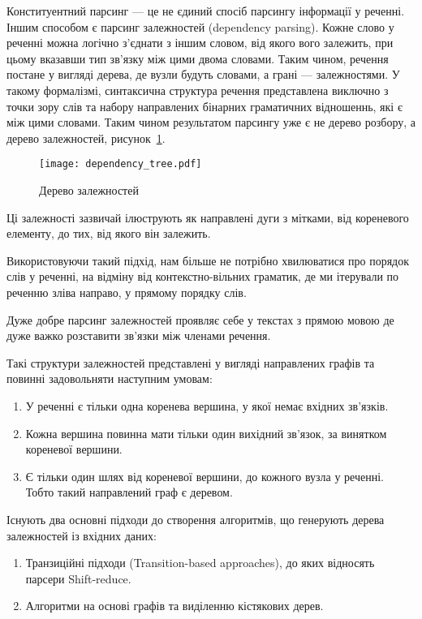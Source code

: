 Конституентний парсинг --- це не єдиний спосіб парсингу інформації у реченні.
Іншим способом є парсинг залежностей (dependency parsing). Кожне слово у
реченні можна логічно з'єднати з іншим словом, від якого вого залежить,
при цьому вказавши тип зв'язку між цими двома словами. Таким чином, речення
постане у вигляді дерева, де вузли будуть словами, а грані --- залежностями.
У такому формалізмі, синтаксична структура речення представлена
виключно з точки зору слів та набору направлених бінарних граматичних відношеннь,
які є між цими словами. Таким чином результатом парсингу уже є не дерево розбору,
а дерево залежностей, рисунок~\ref{img:dependency_tree}.
\begin{figure}[ht]
  \begin{center}
    \texttt{[image: dependency\_tree.pdf]}
  \end{center}
  \caption{Дерево залежностей}
  \label{img:dependency_tree}
\end{figure}

Ці залежності зазвичай ілюструють як направлені дуги з мітками, від кореневого
елементу, до тих, від якого він залежить.

Використовуючи такий підхід, нам більше не потрібно хвилюватися про
порядок слів у реченні, на відміну від контекстно-вільних граматик, де ми
ітерували по реченню зліва направо, у прямому порядку слів.

Дуже добре парсинг залежностей проявляє себе у текстах з прямою мовою
де дуже важко розставити зв'язки між членами речення.

Такі структури залежностей представлені у вигляді направлених графів та
повинні задовольняти наступним умовам:
\begin{enumerate}
    \item У реченні є тільки одна коренева вершина, у якої немає вхідних зв'язків.
    \item Кожна вершина повинна мати тільки один вихідний зв'язок, за
    винятком кореневої вершини.
    \item Є тільки один шлях від кореневої вершини, до кожного
    вузла у реченні. Тобто такий направлений граф є деревом.
\end{enumerate}

Існують два основні підходи до створення алгоритмів, що генерують дерева
залежностей із вхідних даних:
\begin{enumerate}
    \item Транзиційні підходи (Transition-based approaches), до яких відносять парсери
    Shift-reduce.
    \item Алгоритми на основі графів та виділенню кістякових дерев.
\end{enumerate}

